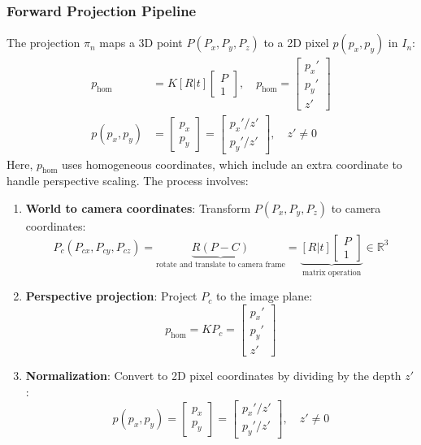 \documentclass{article}
\begin{document}
\subsubsection*{Forward Projection Pipeline}
The projection \( \pi_n \) maps a 3D point \( P(P_x, P_y, P_z) \) to a 2D pixel \( p(p_x, p_y) \) in \( I_n \):
\begin{align}
p_{\text{hom}} &= K [R | t] \begin{bmatrix} P \\ 1 \end{bmatrix}, \quad p_{\text{hom}} = \begin{bmatrix} p_x' \\ p_y' \\ z' \end{bmatrix} \\
p(p_x, p_y) &= \begin{bmatrix} p_x \\ p_y \end{bmatrix} = \begin{bmatrix} p_x' / z' \\ p_y' / z' \end{bmatrix}, \quad z' \neq 0
\end{align}
Here, \( p_{\text{hom}} \) uses homogeneous coordinates, which include an extra coordinate to handle perspective scaling. The process involves:
\begin{enumerate}
    \item \textbf{World to camera coordinates}: Transform \( P(P_x, P_y, P_z) \) to camera coordinates:
    \[
    P_c(P_{cx}, P_{cy}, P_{cz}) = \underbrace{R (P - C)}_{\text{rotate and translate to camera frame}} = \underbrace{[R | t] \begin{bmatrix} P \\ 1 \end{bmatrix}}_{\text{matrix operation}} \in \mathbb{R}^3
    \]
    \item \textbf{Perspective projection}: Project \( P_c \) to the image plane:
    \[
    p_{\text{hom}} = K P_c = \begin{bmatrix} p_x' \\ p_y' \\ z' \end{bmatrix}
    \]
    \item \textbf{Normalization}: Convert to 2D pixel coordinates by dividing by the depth \( z' \):
    \[
    p(p_x, p_y) = \begin{bmatrix} p_x \\ p_y \end{bmatrix} = \begin{bmatrix} p_x' / z' \\ p_y' / z' \end{bmatrix}, \quad z' \neq 0
    \]
\end{enumerate}

\end{document}
